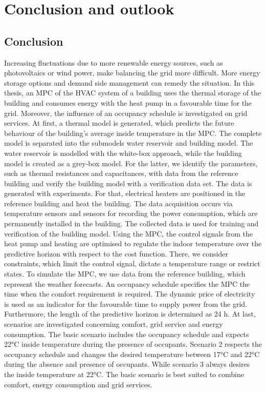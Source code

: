 \chapter{Conclusion and outlook}
\label{ch:Conclusionandoutlook}

\section{Conclusion}
\label{sec:conclusion}
Increasing fluctuations due to more renewable energy sources, such as photovoltaics or wind power, make balancing the grid more difficult. More energy storage options and demand side management can remedy the situation. In this thesis, an MPC of the HVAC system of a building uses the thermal storage of the building and consumes energy with the heat pump in a favourable time for the grid. Moreover, the influence of an occupancy schedule is investigated on grid services.\newline
At first, a thermal model is generated, which predicts the future behaviour of the building's average inside temperature in the MPC. The complete model is separated into the submodels water reservoir and building model. The water reservoir is modelled with the white-box approach, while the building model is created as a grey-box model. For the latter, we identify the parameters, such as thermal resistances and capacitances, with data from the reference building and verify the building model with a verification data set. The data is generated with experiments. For that, electrical heaters are positioned in the reference building and heat the building. The data acquisition occurs via temperature sensors and sensors for recording the power consumption, which are permanently installed in the building. The collected data is used for training and verification of the building model. \newline
Using the MPC, the control signals from the heat pump and heating are optimised to regulate the indoor temperature over the predictive horizon with respect to the cost function. There, we consider constraints, which limit the control signal, dictate a temperature range or restrict states. To simulate the MPC, we use data from the reference building, which represent the weather forecasts. An occupancy schedule specifies the MPC the time when the comfort requirement is required. The dynamic price of electricity is used as an indicator for the favourable time to supply power from the grid. Furthermore, the length of the predictive horizon is determined as 24 h.\newline
At last, scenarios are investigated concerning comfort, grid service and energy consumption. The basic scenario includes the occupancy schedule and expects 22°C inside temperature during the presence of occupants. Scenario 2 respects the occupancy schedule and changes the desired temperature between 17°C and 22°C during the absence and presence of occupants. While scenario 3 always desires the inside temperature at 22°C. The basic scenario is best suited to combine comfort, energy consumption and grid services.\newline


